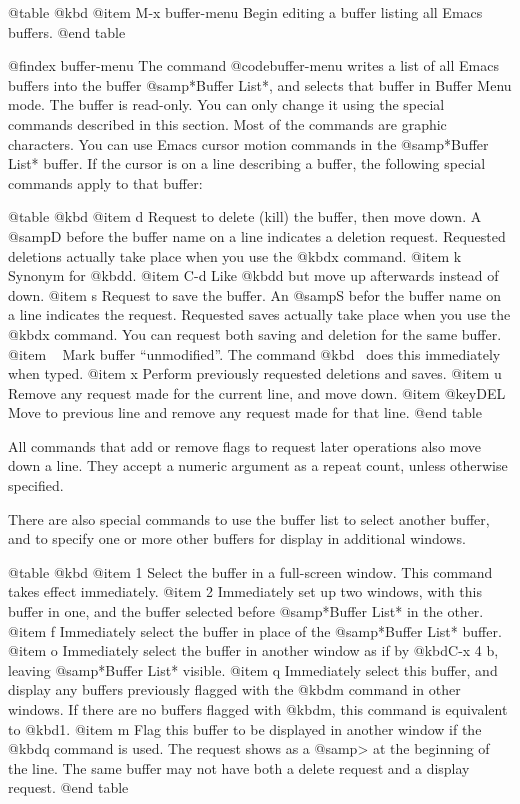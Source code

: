 {{{{{{{{{{{{{{{{{{{{@table @kbd
@item M-x buffer-menu
Begin editing a buffer listing all Emacs buffers.
@end table

@findex buffer-menu
  The command @code{buffer-menu} writes a list of all Emacs buffers into
the buffer @samp{*Buffer List*}, and selects that buffer in Buffer Menu
mode.  The buffer is read-only.  You can only change it using the special
commands described in this section.  Most of the commands are graphic
characters.  You can use  Emacs cursor motion commands in the
@samp{*Buffer List*} buffer.  If the cursor is on a line describing a
buffer, the following  special commands apply to that buffer:

@table @kbd
@item d
Request to delete (kill) the buffer, then move down.  A @samp{D} before
the buffer name on a line indicates a deletion request.  Requested
deletions actually take place when you use the @kbd{x} command.
@item k
Synonym for @kbd{d}.
@item C-d
Like @kbd{d} but move up afterwards instead of down.
@item s
Request to save the buffer.  An @samp{S} befor the buffer name on a line
indicates the request.  Requested saves actually take place when you use
the @kbd{x} command.  You can request both saving and deletion for the
same buffer.
@item ~
Mark buffer ``unmodified''.  The command @kbd{~} does this
immediately when typed.
@item x
Perform previously requested deletions and saves.
@item u
Remove any request made for the current line, and move down.
@item @key{DEL}
Move to previous line and remove any request made for that line.
@end table

  All commands that add or remove flags to request later operations
also move down a line.  They accept a numeric argument as a repeat count,
unless otherwise specified.

  There are also special commands to use the buffer list to select another
buffer, and to specify one or more other buffers for display in additional
windows.

@table @kbd
@item 1
Select the buffer in a full-screen window.  This command takes effect
immediately.
@item 2
Immediately set up two windows, with this buffer in one, and the
buffer selected before @samp{*Buffer List*} in the other.
@item f
Immediately select the buffer in place of the @samp{*Buffer List*} buffer.
@item o
Immediately select the buffer in another window as if by @kbd{C-x 4 b},
leaving @samp{*Buffer List*} visible.
@item q
Immediately select this buffer, and display any buffers previously
flagged with the @kbd{m} command in other windows.  If there are no 
buffers flagged with @kbd{m}, this command is equivalent to @kbd{1}.
@item m
Flag this buffer to be displayed in another window if the @kbd{q}
command is used.  The request shows as a @samp{>} at the beginning of
the line.  The same buffer may not have both a delete request and a
display request.
@end table

}}}}}}}}}}}}}}}}}}}}
